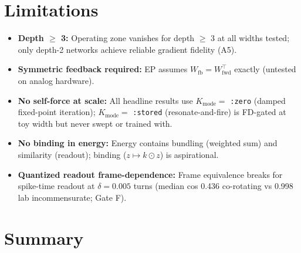 \documentclass[11pt]{article}
\theoremstyle{definition}
\begin{document}
\section{Limitations}\label{sec:limitations}

\begin{itemize}
\item \textbf{Depth $\ge$ 3:} Operating zone vanishes for depth $\ge$ 3
  at all widths tested; only depth-2 networks achieve reliable
  gradient fidelity (A5).
\item \textbf{Symmetric feedback required:} EP assumes $W_{\text{fb}}
  = W_{\text{fwd}}^\top$ exactly (untested on analog hardware).
\item \textbf{No self-force at scale:} All headline results use
  $K_\text{mode}=$ \texttt{:zero} (damped fixed-point iteration);
  $K_\text{mode}=$ \texttt{:stored} (resonate-and-fire) is FD-gated at
  toy width but never swept or trained with.
\item \textbf{No binding in energy:} Energy contains bundling
  (weighted sum) and similarity (readout); binding ($z \mapsto k \odot
  z$) is aspirational.
\item \textbf{Quantized readout frame-dependence:} Frame equivalence
  breaks for spike-time readout at $\delta=0.005$ turns (median cos
  0.436 co-rotating vs 0.998 lab incommensurate; Gate F).
\end{itemize}

\section{Summary}\label{sec:summary}
\end{document}
